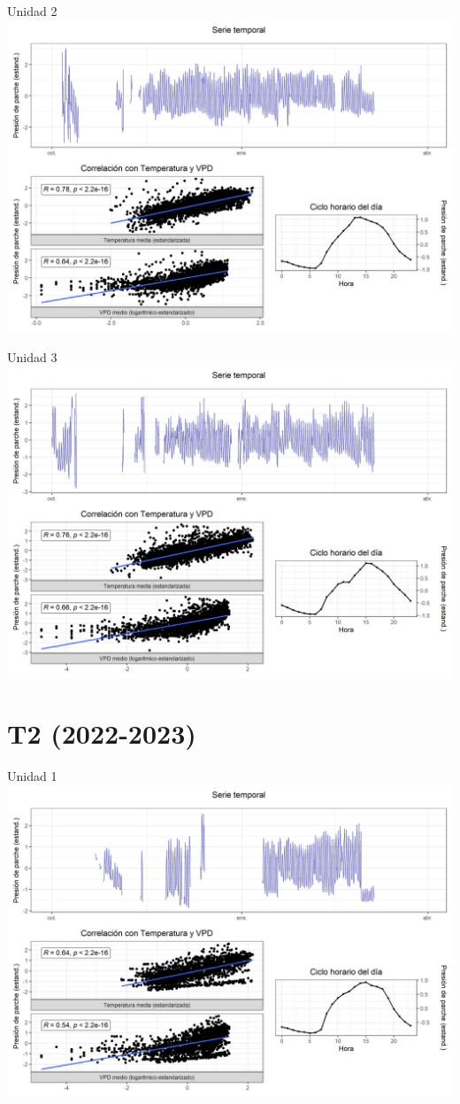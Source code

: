 \documentclass[
  letterpaper,
  DIV=11,
  numbers=noendperiod]{scrreprt}
\begin{document}
Unidad 2
\includegraphics{figuras/04_turgor_unidad/2022_2023_Rio_Claro_T1_Unidad_2.png}

Unidad 3
\includegraphics{figuras/04_turgor_unidad/2022_2023_Rio_Claro_T1_Unidad_3.png}

\chapter{T2 (2022-2023)}

Unidad 1
\includegraphics{figuras/04_turgor_unidad/2022_2023_Rio_Claro_T2_Unidad_1.png}
\end{document}
